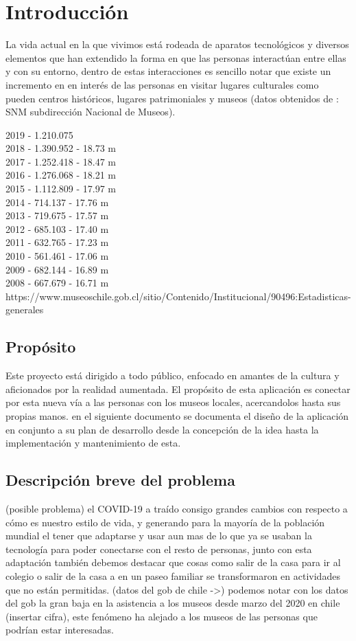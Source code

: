 \section{Introducción}
\color{red}
La vida actual en la que vivimos está rodeada de aparatos tecnológicos y diversos elementos que han extendido la forma en que las personas interactúan entre ellas y con su entorno, dentro de estas interacciones es sencillo notar que existe un incremento en en interés de las personas en visitar lugares culturales como pueden centros históricos, lugares patrimoniales y museos (datos obtenidos de : SNM subdirección Nacional de Museos).

2019 - 1.210.075\\
2018 - 1.390.952 - 18.73 m\\
2017 - 1.252.418 - 18.47 m\\
2016 - 1.276.068 - 18.21 m\\
2015 - 1.112.809 - 17.97 m\\
2014 - 714.137 - 17.76 m\\
2013 - 719.675 - 17.57 m\\
2012 - 685.103 - 17.40 m\\
2011 - 632.765 - 17.23 m\\
2010 - 561.461 - 17.06 m\\
2009 - 682.144 - 16.89 m\\
2008 - 667.679 - 16.71 m\\
https://www.museoschile.gob.cl/sitio/Contenido/Institucional/90496:Estadisticas-generales\\
\color{black}

\subsection{Propósito}
\color{red}
Este proyecto está dirigido a todo público, enfocado en amantes de la cultura y aficionados por la realidad aumentada.
El propósito de esta aplicación es conectar por esta nueva vía a las personas con los museos locales, acercandolos hasta sus propias manos.
 en el siguiente documento se documenta el diseño de la aplicación en conjunto a su plan de desarrollo desde la concepción de la idea hasta la implementación y mantenimiento de esta.

\color{black}

\subsection{Descripción breve del problema}
\color{red}
(posible problema) el COVID-19 a traído consigo grandes cambios con respecto a cómo es nuestro estilo de vida, y generando para la mayoría de la población mundial el tener que adaptarse y usar aun mas de lo que ya se usaban la tecnología para poder conectarse con el resto de personas,  junto con esta adaptación también debemos destacar que cosas como salir de la casa para ir al colegio o salir de la casa a en un paseo familiar se transformaron en actividades que no están permitidas. (datos del gob de chile ->) podemos notar con los datos del gob la gran baja en la asistencia a los museos desde marzo del 2020 en chile (insertar cifra), este fenómeno ha alejado a los museos de las personas que podrían estar interesadas.

\color{black}